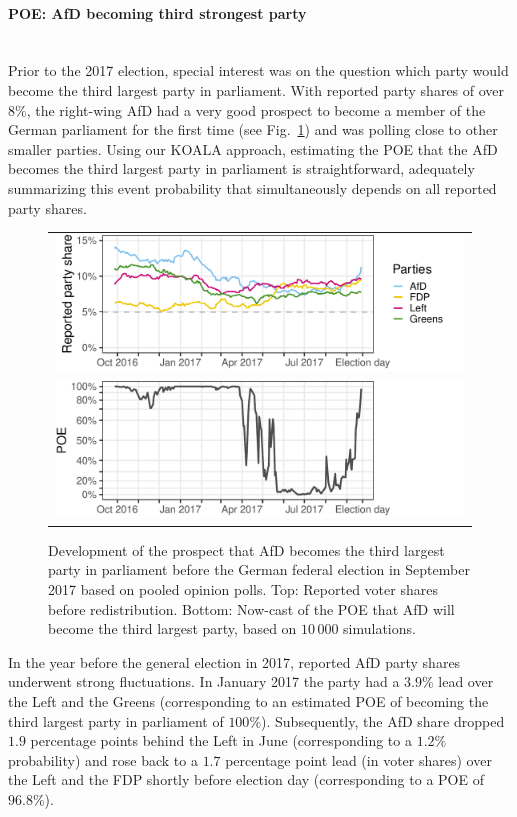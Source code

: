\documentclass[smallcondensed]{svjour3_edited}     %
\begin{document}
\paragraph{POE: AfD becoming third strongest party} \ \\
Prior to the 2017 election, special interest was on the question
which party would become the third largest party in parliament.
With reported party shares of over $8\%$, the right-wing AfD had a very good
prospect to become a member of the German parliament for the first time
(see Fig.~\ref{fig:2017_afd}) and was polling close to other smaller parties.
Using our KOALA approach, estimating the POE that the AfD becomes
the third largest party in parliament is straightforward, adequately summarizing
this event probability that simultaneously depends on all reported party shares.

\begin{figure}[H]\centering
\begin{tabular}{l}
\includegraphics[height=.2\textwidth]{fig_2017_pooled_afd_rawShares.pdf}
\\
\includegraphics[height=.2\textwidth]{fig_2017_pooled_afd_thirdPartyProb.pdf}
\end{tabular}
\caption{Development of the prospect that AfD becomes the third largest party
in parliament before the German federal election in September 2017 based on pooled
opinion polls.
Top: Reported voter shares before redistribution.
Bottom: Now-cast of the POE that AfD will become the third largest party,
based on $10\,000$ simulations.
\label{fig:2017_afd}
}
\end{figure}

In the year before the general election in 2017, reported AfD party shares
underwent strong fluctuations. In January 2017 the party had a $3.9\%$ lead
over the Left and the Greens (corresponding to an estimated POE of
becoming the third largest party in parliament of $100\%$). Subsequently, the
AfD share dropped $1.9$ percentage points behind the Left in June
(corresponding to a $1.2\%$ probability)
and rose back to a $1.7$ percentage point lead (in voter shares) over the Left
and the FDP shortly before election day (corresponding to a POE of $96.8\%$).
\end{document}
